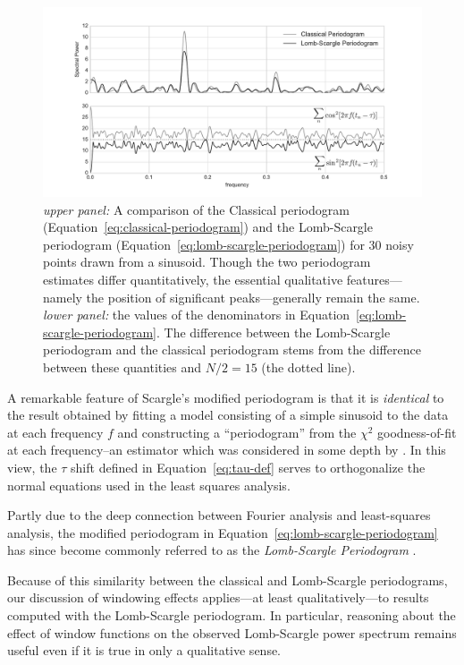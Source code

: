\documentclass[preprint]{aastex}
\newcommand{\figlabel}[1]{\label{fig:#1}}
\newcommand{\Eq}[1]{Equation~\ref{eq:#1}}
\newcommand{\eq}[1]{\Eq{#1}}
\begin{document}
\begin{figure}[ht]
  \centering
  \includegraphics[width=\textwidth]{fig17_ls_comparison}
  \caption{{\it upper panel:} A comparison of the Classical periodogram
    (\eq{classical-periodogram}) and the Lomb-Scargle periodogram
    (\eq{lomb-scargle-periodogram}) for 30 noisy points drawn from a sinusoid.
    Though the two periodogram estimates differ quantitatively, the essential
    qualitative features---namely the position of significant peaks---generally
    remain the same.
    {\it lower panel:} the values of the denominators in
    \eq{lomb-scargle-periodogram}.
    The difference between the Lomb-Scargle periodogram and the classical
    periodogram stems from the difference between these quantities
    and $N/2 = 15$ (the dotted line).
    \figlabel{ls-comparison}}
\end{figure}

A remarkable feature of Scargle's modified periodogram is that it is
{\it identical} to the result
obtained by fitting a model consisting of a simple sinusoid to the data at
each frequency $f$ and
constructing a ``periodogram'' from the $\chi^2$ goodness-of-fit at each
frequency--an estimator which was considered in some depth by \citet{Lomb76}.
In this view, the $\tau$ shift defined in \eq{tau-def} serves to orthogonalize
the normal equations used in the least squares analysis.

Partly due to the deep connection between Fourier analysis and least-squares
analysis, the modified periodogram in \eq{lomb-scargle-periodogram}
has since become commonly referred to as the {\it Lomb-Scargle Periodogram}
\citep[though versions of this approach had been employed even earlier;
  see, e.g.][]{Gottlieb75}.

Because of this similarity between the classical and Lomb-Scargle periodograms,
our discussion of windowing effects applies---at least qualitatively---to
results computed with the Lomb-Scargle periodogram.
In particular, reasoning about the effect of window functions on the observed
Lomb-Scargle power spectrum remains useful even if it is true in only a
qualitative sense.
\end{document}
